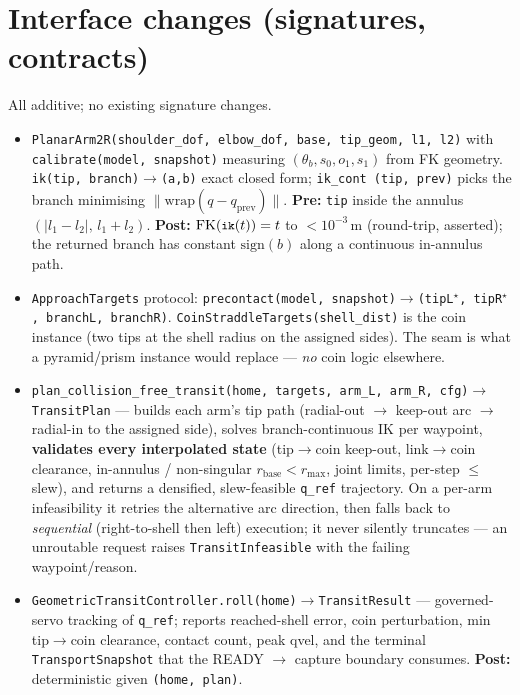 \documentclass[11pt]{article}
\newcommand{\code}[1]{\texttt{\small #1}}
\begin{document}
\section{Interface changes (signatures, contracts)}
All additive; no existing signature changes.
\begin{itemize}[nosep,leftmargin=1.4em]
  \item \code{PlanarArm2R(shoulder\_dof, elbow\_dof, base, tip\_geom, l1, l2)} with \code{calibrate(model, snapshot)}
  measuring $(\theta_b,s_0,o_1,s_1)$ from FK geometry. \code{ik(tip, branch)$\to$(a,b)} exact closed form; \code{ik\_cont
  (tip, prev)} picks the branch minimising $\lVert\mathrm{wrap}(q-q_{\text{prev}})\rVert$. \textbf{Pre:} \code{tip} inside
  the annulus $(\lvert l_1-l_2\rvert,\,l_1+l_2)$. \textbf{Post:} $\mathrm{FK}(\code{ik}(t))=t$ to $<10^{-3}$\,m
  (round-trip, asserted); the returned branch has constant $\mathrm{sign}(b)$ along a continuous in-annulus path.
  \item \code{ApproachTargets} protocol: \code{precontact(model, snapshot)$\to$(tipL$^\star$, tipR$^\star$,
  branchL, branchR)}. \code{CoinStraddleTargets(shell\_dist)} is the coin instance (two tips at the shell radius on the
  assigned sides). The seam is what a pyramid/prism instance would replace --- \emph{no} coin logic elsewhere.
  \item \code{plan\_collision\_free\_transit(home, targets, arm\_L, arm\_R, cfg)$\to$TransitPlan} --- builds each arm's
  tip path (radial-out $\to$ keep-out arc $\to$ radial-in to the assigned side), solves branch-continuous IK per
  waypoint, \textbf{validates every interpolated state} (tip$\to$coin keep-out, link$\to$coin clearance, in-annulus /
  non-singular $r_{\text{base}}<r_{\max}$, joint limits, per-step $\le$ slew), and returns a densified, slew-feasible
  \code{q\_ref} trajectory. On a per-arm infeasibility it retries the alternative arc direction, then falls back to
  \emph{sequential} (right-to-shell then left) execution; it never silently truncates --- an unroutable request raises
  \code{TransitInfeasible} with the failing waypoint/reason.
  \item \code{GeometricTransitController.roll(home)$\to$TransitResult} --- governed-servo tracking of \code{q\_ref};
  reports reached-shell error, coin perturbation, min tip$\to$coin clearance, contact count, peak qvel, and the terminal
  \code{TransportSnapshot} that the READY $\to$ capture boundary consumes. \textbf{Post:} deterministic given
  \code{(home, plan)}.
\end{itemize}
\end{document}
